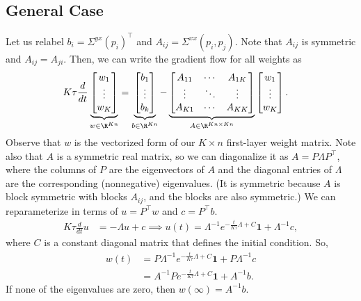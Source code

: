 \documentclass{article}
\begin{document}
\subsection{General Case}
Let us relabel %
$b_i = \Sigma^{yx}(p_i)^\top$ and $A_{ij} = \Sigma^{xx}(p_i,p_j)$.
Note that $A_{ij}$ is symmetric and $A_{ij} = A_{ji}$.
Then, we can write the gradient flow for all weights as
\begin{align}
  K \tau \frac{d}{dt} \underbrace{\begin{bmatrix} w_1 \\ \vdots \\ w_K \end{bmatrix}}_{w \in \R^{Kn}}
  &= \underbrace{\begin{bmatrix} b_1 \\ \vdots \\ b_k \end{bmatrix}}_{b \in \R^{Kn}} - \underbrace{\begin{bmatrix} A_{11} & \cdots & A_{1K} \\ \vdots & \ddots & \vdots \\ A_{K1} & \cdots & A_{KK} \end{bmatrix}}_{A \in \R^{Kn \times Kn}} \begin{bmatrix} w_1 \\ \vdots \\ w_K \end{bmatrix}.
\end{align}
Observe that $w$ is the vectorized form of our $K \times n$ first-layer weight matrix.
Note also that $A$ is a symmetric real matrix, so we can diagonalize it as $A = P \Lambda P^\top$, where the columns of $P$ are the eigenvectors of $A$ and the diagonal entries of $\Lambda$ are the corresponding (nonnegative) eigenvalues.
(It is symmetric because $A$ is block symmetric with blocks $A_{ij}$, and the blocks are also symmetric.)
We can reparameterize in terms of $u = P^\top w$ and $c = P^\top b$.
\begin{align}
  K \tau \frac{d}{dt} u &= - \Lambda u + c
  \implies
  u(t) = \Lambda^{-1} e^{ -\frac{t}{K \tau} \Lambda + C } \mathbf{1} + \Lambda^{-1} c,
\end{align}
where $C$ is a constant diagonal matrix that defines the initial condition.
So,
\begin{align}
  w(t) 
  &= P \Lambda^{-1} e^{ -\frac{t}{K \tau} \Lambda + C } \mathbf{1} + P \Lambda^{-1} c \\
  &= A^{-1} P e^{ -\frac{t}{K \tau} \Lambda + C } \mathbf{1} + A^{-1} b.
\end{align}
If none of the eigenvalues are zero, then $w(\infty) = A^{-1} b$.
\end{document}
